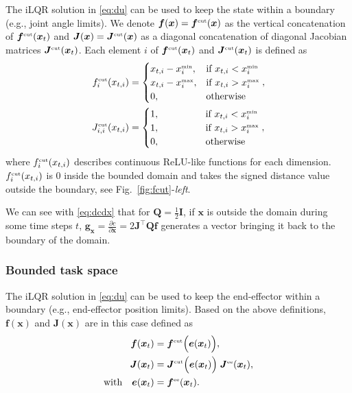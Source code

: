 \documentclass[10pt,a4paper]{article} %
\newcommand{\trsp}{{\scriptscriptstyle\top}}
\newcommand{\tp}[1]{\text{\tiny#1}}
\newcommand{\tmin}{{\scriptscriptstyle\min}}
\newcommand{\tmax}{{\scriptscriptstyle\max}}
\begin{document}
The iLQR solution in \eqref{eq:du} can be used to keep the state within a boundary (e.g., joint angle limits). We denote $\bm{f}(\bm{x})=\bm{f}^\tp{cut}(\bm{x})$ as the vertical concatenation of $\bm{f}^\tp{cut}(\bm{x}_t)$ and $\bm{J}(\bm{x})=\bm{J}^\tp{cut}(\bm{x})$ as a diagonal concatenation of diagonal Jacobian matrices $\bm{J}^\tp{cut}(\bm{x}_t)$. Each element $i$ of $\bm{f}^\tp{cut}(\bm{x}_t)$ and $\bm{J}^\tp{cut}(\bm{x}_t)$ is defined as 
\begin{align*}
	f^\tp{cut}_i(x_{t,i}) &= 
	\begin{cases} 
	x_{t,i} - x_i^\tmin, & \text{if}\ x_{t,i} < x_i^\tmin \\
	x_{t,i} - x_i^\tmax, & \text{if}\ x_{t,i} > x_i^\tmax \\
	0, & \text{otherwise} 
	\end{cases},\\
	J^\tp{cut}_{i,i}(x_{t,i}) &= 
	\begin{cases} 
	1,\hspace{14mm} & \text{if}\ x_{t,i} < x_i^\tmin \\
	1, & \text{if}\ x_{t,i} > x_i^\tmax \\
	0, & \text{otherwise} 
	\end{cases},
\end{align*}
where $f^\tp{cut}_i(x_{t,i})$ describes continuous ReLU-like functions for each dimension. $f^\tp{cut}_i(x_{t,i})$ is $0$ inside the bounded domain and takes the signed distance value outside the boundary, see Fig.~\ref{fig:fcut}-\emph{left}.

We can see with \eqref{eq:dcdx} that for $\bm{Q}=\frac{1}{2}\bm{I}$, if $\bm{x}$ is outside the domain during some time steps $t$, $\bm{g}_{\bm{x}} = \frac{\partial c}{\partial\bm{x}} = 2 {\bm{J}}^\trsp \bm{Q} \bm{f}$ generates a vector bringing it back to the boundary of the domain.


\subsubsection{Bounded task space}

The iLQR solution in \eqref{eq:du} can be used to keep the end-effector within a boundary (e.g., end-effector position limits).
Based on the above definitions, $\bm{f}(\bm{x})$ and $\bm{J}(\bm{x})$ are in this case defined as
\begin{align*}
	\bm{f}(\bm{x}_t) &= \bm{f}^\tp{cut}\Big(\bm{e}(\bm{x}_t)\Big), \\
	\bm{J}(\bm{x}_t) &= \bm{J}^\tp{cut}\Big(\bm{e}(\bm{x}_t)\Big) \; \bm{J}^\tp{ee}(\bm{x}_t), \\
	\text{with}\quad \bm{e}(\bm{x}_t) &= \bm{f}^\tp{ee}(\bm{x}_t).
\end{align*}
\end{document}
